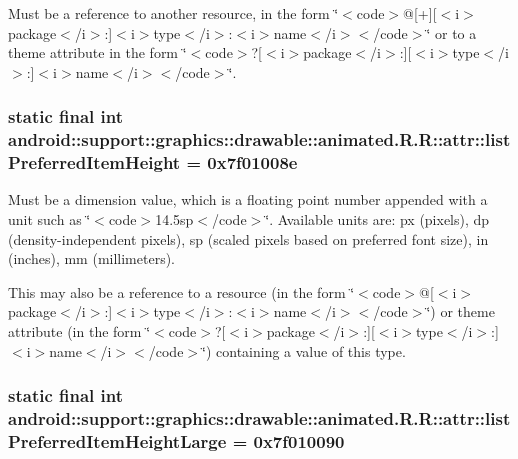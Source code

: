 Must be a reference to another resource, in the form \char`\"{}$<$code$>$@\mbox{[}+\mbox{]}\mbox{[}$<$i$>$package$<$/i$>$:\mbox{]}$<$i$>$type$<$/i$>$:$<$i$>$name$<$/i$>$$<$/code$>$\char`\"{} or to a theme attribute in the form \char`\"{}$<$code$>$?\mbox{[}$<$i$>$package$<$/i$>$:\mbox{]}\mbox{[}$<$i$>$type$<$/i$>$:\mbox{]}$<$i$>$name$<$/i$>$$<$/code$>$\char`\"{}. \hypertarget{classandroid_1_1support_1_1graphics_1_1drawable_1_1animated_1_1_r_1_1attr_98494be82701302ec81859baf11b7b7b}{
\subsubsection[{listPreferredItemHeight}]{\setlength{\rightskip}{0pt plus 5cm}static final int android::support::graphics::drawable::animated.R.R::attr::listPreferredItemHeight = 0x7f01008e}}
\label{classandroid_1_1support_1_1graphics_1_1drawable_1_1animated_1_1_r_1_1attr_98494be82701302ec81859baf11b7b7b}


Must be a dimension value, which is a floating point number appended with a unit such as \char`\"{}$<$code$>$14.5sp$<$/code$>$\char`\"{}. Available units are: px (pixels), dp (density-independent pixels), sp (scaled pixels based on preferred font size), in (inches), mm (millimeters). 

This may also be a reference to a resource (in the form \char`\"{}$<$code$>$@\mbox{[}$<$i$>$package$<$/i$>$:\mbox{]}$<$i$>$type$<$/i$>$:$<$i$>$name$<$/i$>$$<$/code$>$\char`\"{}) or theme attribute (in the form \char`\"{}$<$code$>$?\mbox{[}$<$i$>$package$<$/i$>$:\mbox{]}\mbox{[}$<$i$>$type$<$/i$>$:\mbox{]}$<$i$>$name$<$/i$>$$<$/code$>$\char`\"{}) containing a value of this type. \hypertarget{classandroid_1_1support_1_1graphics_1_1drawable_1_1animated_1_1_r_1_1attr_2771648aa61ad82dc9efb993be87dac1}{
\subsubsection[{listPreferredItemHeightLarge}]{\setlength{\rightskip}{0pt plus 5cm}static final int android::support::graphics::drawable::animated.R.R::attr::listPreferredItemHeightLarge = 0x7f010090}}
\label{classandroid_1_1support_1_1graphics_1_1drawable_1_1animated_1_1_r_1_1attr_2771648aa61ad82dc9efb993be87dac1}


